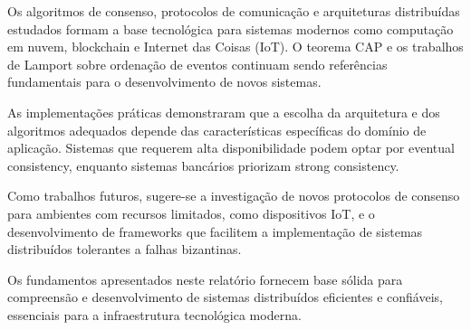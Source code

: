 Os algoritmos de consenso, protocolos de comunicação e arquiteturas distribuídas estudados formam a base tecnológica para sistemas modernos como computação em nuvem, blockchain e Internet das Coisas (IoT). O teorema CAP e os trabalhos de Lamport sobre ordenação de eventos continuam sendo referências fundamentais para o desenvolvimento de novos sistemas.

As implementações práticas demonstraram que a escolha da arquitetura e dos algoritmos adequados depende das características específicas do domínio de aplicação. Sistemas que requerem alta disponibilidade podem optar por eventual consistency, enquanto sistemas bancários priorizam strong consistency.

Como trabalhos futuros, sugere-se a investigação de novos protocolos de consenso para ambientes com recursos limitados, como dispositivos IoT, e o desenvolvimento de frameworks que facilitem a implementação de sistemas distribuídos tolerantes a falhas bizantinas.

Os fundamentos apresentados neste relatório fornecem base sólida para compreensão e desenvolvimento de sistemas distribuídos eficientes e confiáveis, essenciais para a infraestrutura tecnológica moderna.
